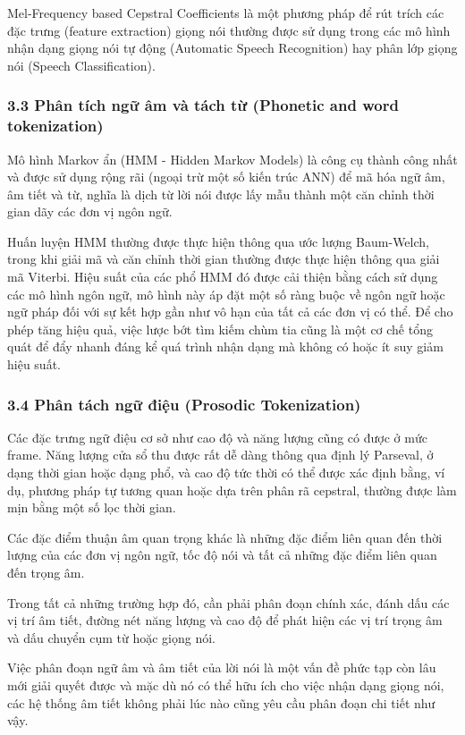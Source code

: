 \documentclass{article}
\begin{document}
	Mel-Frequency based Cepstral Coefficients là một phương pháp để rút trích các đặc trưng (feature extraction) giọng nói thường được sử dụng trong các mô hình nhận dạng giọng nói tự động (Automatic Speech Recognition) hay phân lớp giọng nói (Speech Classification).
	\subsubsection{3.3 Phân tích ngữ âm và tách từ (Phonetic and word tokenization)}
	\qquad Mô hình Markov ẩn (HMM - Hidden Markov Models) là công cụ thành công nhất và được sử dụng rộng rãi (ngoại trừ một số kiến trúc ANN) để mã hóa ngữ âm, âm tiết và từ, nghĩa là dịch từ lời nói được lấy mẫu thành một căn chỉnh thời gian dãy các đơn vị ngôn ngữ.
	
	Huấn luyện HMM thường được thực hiện thông qua ước lượng Baum-Welch, trong khi giải mã và căn chỉnh thời gian thường được thực hiện thông qua giải mã Viterbi. Hiệu suất của các phổ HMM đó được cải thiện bằng cách sử dụng các mô hình ngôn ngữ, mô hình này áp đặt một số ràng buộc về ngôn ngữ hoặc ngữ pháp đối với sự kết hợp gần như vô hạn của tất cả các đơn vị có thể. Để cho phép tăng hiệu quả, việc lược bớt tìm kiếm chùm tia cũng là một cơ chế tổng quát để đẩy nhanh đáng kể quá trình nhận dạng mà không có hoặc ít suy giảm hiệu suất.
	
	\subsubsection{3.4 Phân tách ngữ điệu (Prosodic Tokenization)}
	\qquad Các đặc trưng ngữ điệu cơ sở như cao độ và năng lượng cũng có được ở mức frame. Năng lượng cửa sổ thu được rất dễ dàng thông qua định lý Parseval, ở dạng thời gian hoặc dạng phổ, và cao độ tức thời có thể được xác định bằng, ví dụ, phương pháp tự tương quan hoặc dựa trên phân rã cepstral, thường được làm mịn bằng một số lọc thời gian.
	
	 Các đặc điểm thuận âm quan trọng khác là những đặc điểm liên quan đến thời lượng của các đơn vị ngôn ngữ, tốc độ nói và tất cả những đặc điểm liên quan đến trọng âm. 
	 
	 Trong tất cả những trường hợp đó, cần phải phân đoạn chính xác, đánh dấu các vị trí âm tiết, đường nét năng lượng và cao độ để phát hiện các vị trí trọng âm và dấu chuyển cụm từ hoặc giọng nói. 
	 
	 Việc phân đoạn ngữ âm và âm tiết của lời nói là một vấn đề phức tạp còn lâu mới giải quyết được và mặc dù nó có thể hữu ích cho việc nhận dạng giọng nói, các hệ thống âm tiết không phải lúc nào cũng yêu cầu phân đoạn chi tiết như vậy.
	
\end{document}
